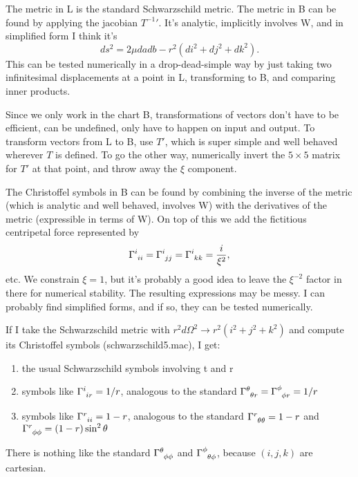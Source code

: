 \documentclass{article}
\begin{document}
The metric in L is the standard Schwarzschild metric.
The metric in B can be found by applying the jacobian ${T^{-1}}'$. It's analytic, implicitly involves W,
and in simplified form I think it's
\begin{equation*}
  ds^2 = 2\mu dadb -r^2(di^2+dj^2+dk^2).
\end{equation*}
This can be tested numerically in a drop-dead-simple way by just taking two
infinitesimal displacements at a point in L, transforming to B, and comparing inner products.

Since we only work in the chart B, transformations of vectors don't have to be
efficient, can be undefined, only have to happen on input and output. To transform vectors
from L to B, use $T'$, which is super simple and well behaved wherever $T$ is defined.
To go the other way, numerically invert the $5\times 5$ matrix for $T'$ at that point,
and throw away the $\xi$ component.

The Christoffel symbols in B can be found by combining the inverse of the metric
(which is analytic and well behaved, involves W) with the derivatives of the metric
(expressible in terms of W). On top of this we add the fictitious centripetal force
represented by
\begin{equation*}
  \Gamma\indices{^i_i_i} = \Gamma\indices{^i_j_j} = \Gamma\indices{^i_k_k} = \frac{i}{\xi^2},
\end{equation*}
etc. We constrain $\xi=1$, but it's probably a good idea to leave the $\xi^{-2}$ factor in
there for numerical stability. The resulting expressions may be messy. I can probably find simplified
forms, and if so, they can be tested numerically.

If I take the Schwarzschild metric with $r^2 d\Omega^2\rightarrow r^2(i^2+j^2+k^2)$ and
compute its Christoffel symbols (schwarzschild5.mac), I get:
\begin{enumerate}
\item the usual Schwarzschild symbols involving t and r
\item symbols like $\Gamma\indices{^i_i_r} = 1/r$, analogous to the standard
                          $\Gamma\indices{^\theta_\theta_r} = \Gamma\indices{^\phi_\phi_r} = 1/r$
\item symbols like $\Gamma\indices{^r_i_i} = 1-r$, analogous to the standard
                         $\Gamma\indices{^r_\theta_\theta}=1-r$ and
                         $\Gamma\indices{^r_\phi_\phi}=(1-r)\sin^2\theta$
\end{enumerate}
There is nothing like the standard $\Gamma\indices{^\theta_\phi_\phi}$ and
$\Gamma\indices{^\phi_\theta_\phi}$, because $(i,j,k)$ are cartesian.
\end{document}
